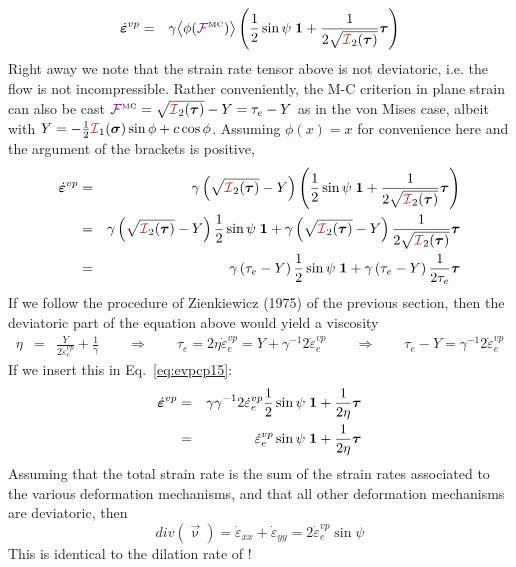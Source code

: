 \begin{eqnarray}
\dot{\bm \varepsilon}^{vp} 
&=& \gamma \big\langle \phi( \FFF^{\text{\tiny MC}} )  \big\rangle 
\left(\frac12 \sin\psi \;  {\bm 1} + \frac{1}{2 \sqrt{{\III}_2(\bm \tau)}} {\bm \tau} \right)
\end{eqnarray}
Right away we note that the strain rate tensor above is not deviatoric, i.e. the flow
is not incompressible.
Rather conveniently, the M-C criterion in plane strain can also 
be cast $\FFF^{\text{\tiny MC}} = \sqrt{{\III}_2(\bm \tau)} -Y = \tau_e - Y$ as in 
the von Mises case, albeit with 
$Y= -\frac12 {\III}_1(\bm\sigma) \sin\phi + c\cos\phi$.
Assuming $\phi(x)=x$ for convenience here and the argument of the brackets is positive, 
\begin{eqnarray}
\dot{\bm \varepsilon}^{vp} 
&=& \gamma \left(\sqrt{{\III}_2(\bm\tau)} - Y \right)
\left(\frac12 \sin\psi \;  {\bm 1} + \frac{1}{2 \sqrt{{\III}_2(\bm \tau)}} {\bm \tau} \right) \nn\\
&=& \gamma \left(\sqrt{{\III}_2(\bm\tau)} - Y \right)
\frac12 \sin\psi \;  {\bm 1} 
+  
\gamma \left(\sqrt{{\III}_2(\bm\tau)} - Y \right)
\frac{1}{2 \sqrt{{\III}_2(\bm \tau)}} {\bm \tau}  \nn\\
&=& \gamma \left(\tau_e - Y \right)
\frac12 \sin\psi \;  {\bm 1} 
+  
\gamma \left(\tau_e - Y \right)
\frac{1}{2 \tau_e} {\bm \tau}  \label{eq:evpcp15}
\end{eqnarray}
If we follow the procedure of Zienkiewicz (1975) of the previous section, then the deviatoric part
of the equation above would yield a viscosity
\begin{eqnarray}
\eta 
&=& \frac{Y}{2  \dot\varepsilon_e^{vp}}
+ \frac{1 }{\gamma } 
\qquad \Rightarrow \qquad 
\tau_e = 2\eta \dot\varepsilon_e^{vp} = Y + \gamma^{-1} 2  \dot\varepsilon_e^{vp}
\qquad 
\Rightarrow
\qquad
\tau_e - Y = \gamma^{-1} 2  \dot\varepsilon_e^{vp}
\end{eqnarray}
If we insert this in Eq.~\eqref{eq:evpcp15}: 
\begin{eqnarray}
\dot{\bm \varepsilon}^{vp} 
&=& \gamma 
\gamma^{-1} 2  \dot\varepsilon_e^{vp}
\frac12 \sin\psi \;  {\bm 1} 
+  
\frac{1}{2\eta}
{\bm \tau}  \nonumber\\
&=& 
\dot\varepsilon_e^{vp}
\sin\psi \;  {\bm 1} 
+  
\frac{1}{2\eta}
{\bm \tau}  
\end{eqnarray}
Assuming that the total strain rate is the sum of the strain rates 
associated to the various deformation mechanisms, and that all
other deformation mechanisms are deviatoric, then 
\[
div (\vec\upnu)=
\dot{\varepsilon}_{xx}
+
\dot{\varepsilon}_{yy}
=
2  \dot\varepsilon_e^{vp}
\sin\psi 
\]
This is identical to the dilation rate of \textcite{chpe15}!


